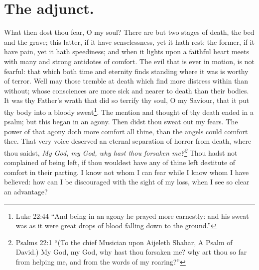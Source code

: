 \section{The adjunct.}
What then dost thou fear, O my soul? There are but two stages of death, the bed and the grave; this latter, if it have senselessness, yet it hath rest; the former, if it have pain, yet it hath speediness; and when it lights upon a faithful heart meets with many and strong antidotes of comfort. The evil that is ever in motion, is not fearful: that which both time and eternity finds standing where it was is worthy of terror. Well may those tremble at death which find more distress within than without; whose consciences are more sick and nearer to death than their bodies. It was thy Father's wrath that did so terrify thy soul, O my Saviour, that it put thy body into a bloody sweat\footnote{Luke 22:44 ``And being in an agony he prayed more earnestly: and his sweat was as it were great drops of blood falling down to the ground.''}. The mention and thought of thy death ended in a psalm; but this began in an agony. Then didst thou sweat out my fears. The power of that agony doth more comfort all thine, than the angels could comfort thee. That very voice deserved an eternal separation of horror from death, where thou saidst, \emph{My God, my God, why hast thou forsaken me?\footnote{Psalms 22:1 ``(To the chief Musician upon Aijeleth Shahar, A Psalm of David.) My God, my God, why hast thou forsaken me? why art thou so far from helping me, and from the words of my roaring?''}} Thou hadst not complained of being left, if thou wouldest have any of thine left destitute of comfort in their parting. I know not whom I can fear while I know whom I have believed: how can I be discouraged with the sight of my loss, when I see so clear an advantage? 

